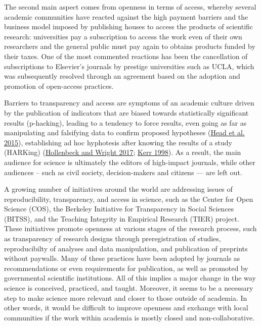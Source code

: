 \documentclass[
  letterpaper,
  DIV=11,
  numbers=noendperiod]{scrartcl}
\begin{document}
The second main aspect comes from openness in terms of access, whereby
several academic communities have reacted against the high payment
barriers and the business model imposed by publishing houses to access
the products of scientific research: universities pay a subscription to
access the work even of their own researchers and the general public
must pay again to obtains products funded by their taxes. One of the
most commented reactions has been the cancellation of subscriptions to
Elsevier's journals by prestige universities such as UCLA, which was
subsequently resolved through an agreement based on the adoption and
promotion of open-access practices.

Barriers to transparency and access are symptoms of an academic culture
driven by the publication of indicators that are biased towards
statistically significant results (p-hacking), leading to a tendency to
force results, even going as far as manipulating and falsifying data to
confirm proposed hypotheses
(\protect\hyperlink{ref-head_extent_2015}{Head et al. 2015}),
establishing ad hoc hyphotesis after knowing the results of a study
(HARKing) (\protect\hyperlink{ref-hollenbeck_harking_2017}{Hollenbeck
and Wright 2017}; \protect\hyperlink{ref-kerr_harking_1998}{Kerr 1998}).
As a result, the main audience for science is ultimately the editors of
high-impact journals, while other audiences -- such as civil society,
decision-makers and citizens --- are left out.

A growing number of initiatives around the world are addressing issues
of reproducibility, transparency, and access in science, such as the
Center for Open Science (COS), the Berkeley Initiative for Transparency
in Social Sciences (BITSS), and the Teaching Integrity in Empirical
Research (TIER) project. These initiatives promote openness at various
stages of the research process, such as transparency of research designs
through preregistration of studies, reproducibilty of analyses and data
manipulation, and publication of preprints without paywalls. Many of
these practices have been adopted by journals as recommendations or even
requirements for publication, as well as promoted by governmental
scientific institutions. All of this implies a major change in the way
science is conceived, practiced, and taught. Moreover, it seems to be a
necessary step to make science more relevant and closer to those outside
of academia. In other words, it would be difficult to improve openness
and exchange with local communities if the work within academia is
mostly closed and non-collaborative.
\end{document}
